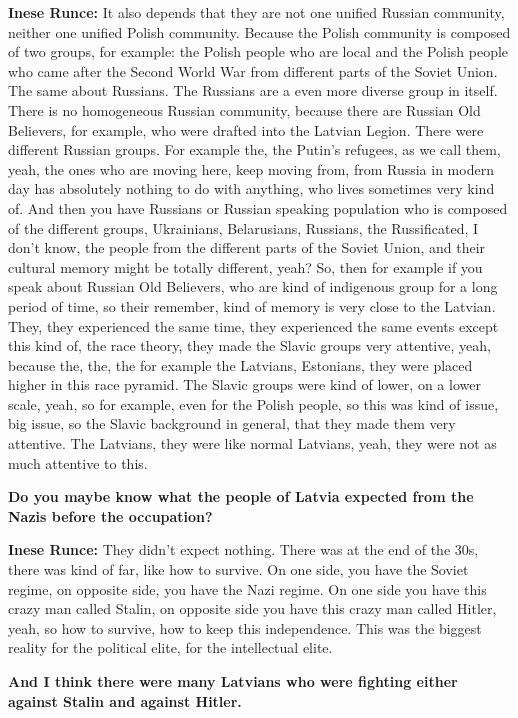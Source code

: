 \textbf{Inese Runce:} It also depends that they are not one unified Russian community, neither one unified Polish community. Because the Polish community is composed of two groups, for example:  the Polish people who are local and the Polish people who came after the Second World War from different parts of the Soviet Union. The same about Russians. The Russians are a even more diverse group in itself. There is no homogeneous Russian community, because there are Russian Old Believers, for example, who were drafted into the Latvian Legion. There were different Russian groups. For example the, the Putin's refugees, as we call them, yeah, the ones who are moving here, keep moving from, from Russia in modern day has absolutely nothing to do with anything, who lives sometimes very kind of. And then you have Russians or Russian speaking population who is composed of the different groups, Ukrainians, Belarusians, Russians, the Russificated, I don't know, the people from the different parts of the Soviet Union, and their cultural memory might be totally different, yeah? So, then for example if you speak about Russian Old Believers, who are kind of indigenous group for a long period of time, so their remember, kind of memory is very close to the Latvian. They, they experienced the same time, they experienced the same events except this kind of, the race theory, they made the Slavic groups very attentive, yeah, because the,  the, the for example the Latvians, Estonians, they were placed higher in this race pyramid. The Slavic groups were kind of lower, on a lower scale, yeah, so for example, even for the Polish people, so this was kind of issue, big issue, so the Slavic background in general, that they made them very attentive. The Latvians, they were like normal Latvians, yeah, they were not as much attentive to this.

\textbf{Do you maybe know what the people of Latvia expected from the Nazis before the occupation?}


\textbf{Inese Runce:} They didn't expect nothing. There was at the end of the 30s, there was kind of far, like how to survive. On one side, you have the Soviet regime, on opposite side, you have the Nazi regime. On one side you have this crazy man called Stalin, on opposite side you have this crazy man called Hitler, yeah, so how to survive, how to keep this independence.  This was the biggest reality for the political elite, for the intellectual elite. 

\textbf{And I think there were many Latvians who were fighting either against Stalin and against Hitler.} 

